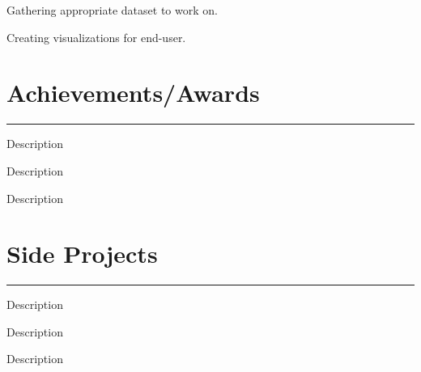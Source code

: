 \documentclass[]{puneet-resume}
\begin{document}
\begin{minipage}[t]{0.66\textwidth}
 
\noindent
\hspace{5em}%
\begin{itemize}
\begin{minipage}{0.85\textwidth\vspace{2pt}}
	\item Gathering appropriate dataset to work on.
	\item Creating visualizations for end-user.
\end{minipage}
\end{itemize}
\sectionsep
\section{Achievements/Awards} 
\noindent\rule{12.5cm}{0.4pt}
 
\noindent
\hspace{5em}%
\begin{minipage}{0.85\textwidth\vspace{2pt}}
Description
\end{minipage}
 
\noindent
\hspace{5em}%
\begin{minipage}{0.85\textwidth\vspace{2pt}}
Description
\end{minipage}
 
\noindent
\hspace{5em}%
\begin{minipage}{0.85\textwidth\vspace{2pt}}
Description
\end{minipage}
\section{Side Projects}
\noindent\rule{12.5cm}{0.4pt}
 
\noindent
\hspace{5em}%
\begin{minipage}{0.85\textwidth\vspace{5pt}}
Description
\end{minipage}
 
\noindent
\hspace{5em}%
\begin{minipage}{0.85\textwidth\vspace{5pt}}
Description
\end{minipage}
 
\noindent
\hspace{5em}%
\begin{minipage}{0.85\textwidth\vspace{5pt}}
Description
\end{minipage}
\end{minipage} 
\end{document}
